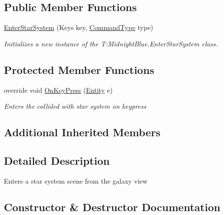 \subsection*{Public Member Functions}
\begin{DoxyCompactItemize}
\item 
\hyperlink{class_midnight_blue_1_1_enter_star_system_a6bea0a7daba691c1b46238114b347377}{Enter\+Star\+System} (Keys key, \hyperlink{namespace_midnight_blue_1_1_engine_1_1_i_o_a8bc3f159399ecadd590f7df1b54354b0}{Command\+Type} type)
\begin{DoxyCompactList}\small\item\em Initializes a new instance of the T\+:\+Midnight\+Blue.\+Enter\+Star\+System class. \end{DoxyCompactList}\end{DoxyCompactItemize}
\subsection*{Protected Member Functions}
\begin{DoxyCompactItemize}
\item 
override void \hyperlink{class_midnight_blue_1_1_enter_star_system_a1cf84a93760ef0cda918915ec8acfa4d}{On\+Key\+Press} (\hyperlink{class_midnight_blue_1_1_engine_1_1_entity_component_1_1_entity}{Entity} e)
\begin{DoxyCompactList}\small\item\em Enters the collided with star system on keypress \end{DoxyCompactList}\end{DoxyCompactItemize}
\subsection*{Additional Inherited Members}


\subsection{Detailed Description}
Enters a star system scene from the galaxy view 



\subsection{Constructor \& Destructor Documentation}
\hypertarget{class_midnight_blue_1_1_enter_star_system_a6bea0a7daba691c1b46238114b347377}{}\label{class_midnight_blue_1_1_enter_star_system_a6bea0a7daba691c1b46238114b347377} 
